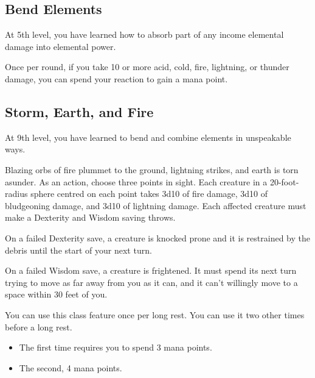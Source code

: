 \begin{multicols*}{2}
\subsection*{Bend Elements}

At 5th level, you have learned how to absorb part of any income elemental damage into elemental power.

Once per round, if you take 10 or more acid, cold, fire, lightning, or thunder damage, you can spend your reaction to gain a mana point.

\subsection*{Storm, Earth, and Fire}

At 9th level, you have learned to bend and combine elements in unspeakable ways.

Blazing orbs of fire plummet to the ground, lightning strikes, and earth is torn asunder. As an action, choose three points in sight. Each creature in a 20-foot-radius sphere centred on each point takes 3d10 of fire damage, 3d10 of bludgeoning damage, and 3d10 of lightning damage.
Each affected creature must make a Dexterity and Wisdom saving throws.


On a failed Dexterity save, a creature is knocked prone and it is restrained by the debris until the start of your next turn.

On a failed Wisdom save, a creature is frightened. It must spend its next turn trying to move as far away from you as it can, and it can't willingly move to a space within 30 feet of you.

You can use this class feature once per long rest. 
You can use it two other times before a long rest. 

\begin{itemize}
    \item The first time requires you to spend 3 mana points. 
    \item The second, 4 mana points.
\end{itemize}


\end{multicols*}

